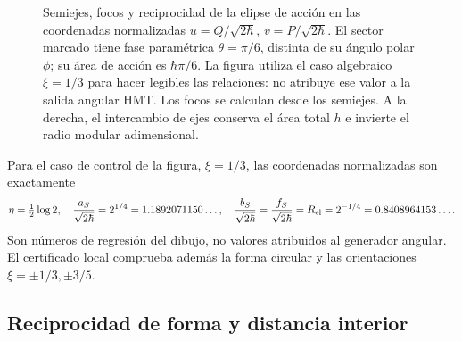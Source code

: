 \begin{figure}[htbp]
\endgroup

 \caption{Semiejes, focos y reciprocidad de la elipse de acción en las
 coordenadas normalizadas \(u=Q/\sqrt{2\hbar}\),
 \(v=P/\sqrt{2\hbar}\). El sector marcado tiene fase paramétrica
 \(\theta=\pi/6\), distinta de su ángulo polar \(\phi\); su área
 de acción es \(\hbar\pi/6\). La figura utiliza el caso algebraico
 \(\xi=1/3\) para hacer legibles las relaciones: no atribuye ese valor
 a la salida angular HMT. Los focos se calculan desde los semiejes.
 A la derecha, el intercambio de ejes conserva el área total \(h\)
 e invierte el radio modular adimensional.}
 \label{fig:ii-elipse-calculada}
\end{figure}

Para el caso de control de la figura, \(\xi=1/3\), las coordenadas
normalizadas son exactamente
\[
 \eta=\tfrac12\log2,\quad
 \frac{a_S}{\sqrt{2\hbar}}=2^{1/4}=1.1892071150\ldots,\quad
 \frac{b_S}{\sqrt{2\hbar}}=
 \frac{f_S}{\sqrt{2\hbar}}=R_{\rm el}=2^{-1/4}=0.8408964153\ldots.
\]
Son números de regresión del dibujo, no valores atribuidos al generador
angular. El certificado local comprueba además la forma circular y las
orientaciones \(\xi=\pm1/3,\pm3/5\).

\subsection{Reciprocidad de forma y distancia interior}

